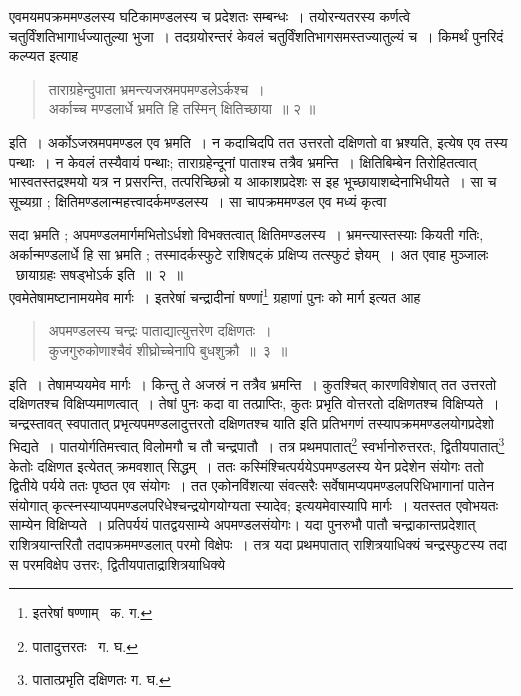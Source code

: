 \documentclass[11pt, openany]{book}
\begin{document}
\indent एवमयमपक्रममण्डलस्य घटिकामण्डलस्य च प्रदेशतः सम्बन्धः~। तयोरन्यतरस्य कर्णत्वे चतुर्विंशतिभागार्धज्यातुल्या भुजा~।	तदग्रयोरन्तरं केवलं चतुर्विंशतिभागसमस्तज्यातुल्यं च~। किमर्थं पुनरिदं कल्प्यत इत्याह\textendash

\begin{quote}
{\ab ताराग्रहेन्दुपाता भ्रमन्त्यजस्रमपमण्डलेऽर्कश्च~।\\
 अर्काच्च मण्डलार्धे भ्रमति हि तस्मिन् क्षितिच्छाया~॥ २ ॥}
\end{quote}

\indent इति~। अर्कोऽजस्रमपमण्डल एव भ्रमति~। न कदाचिदपि तत उत्तरतो दक्षिणतो वा भ्रश्यति, इत्येष एव तस्य पन्थाः~। न केवलं 
तस्यैवायं पन्थाः; ताराग्रहेन्दूनां पाताश्च तत्रैव भ्रमन्ति~। क्षितिबिम्बेन तिरोहितत्वात् भास्वतस्तद्रश्मयो यत्र न प्रसरन्ति, तत्परिच्छिन्नो य आकाशप्रदेशः स इह भूच्छायाशब्देनाभिधीयते~। सा च सूच्यग्रा ; क्षितिमण्डलान्महत्त्वादर्कमण्डलस्य~। सा चापक्रममण्डल एव मध्यं
कृत्वा 
\newpage 

\noindent सदा भ्रमति ; अपमण्डलमार्गमभितोऽर्धशो विभक्तत्वात् क्षितिमण्डलस्य~। भ्रमन्त्यास्तस्याः कियती गतिः, अर्कान्मण्डलार्धे हि सा भ्रमति ; तस्मादर्कस्फुटे राशिषट्कं प्रक्षिप्य तत्स्फुटं ज्ञेयम्~। अत एवाह मुञ्जालः \textendash\ {\qt छायाग्रहः
सषड्भोऽर्क} इति~॥~२~॥ \\

एवमेतेषामष्टानामयमेव मार्गः~। इतरेषां चन्द्रादीनां षण्णां\renewcommand{\thefootnote}{१}\footnote{इतरेषां षण्णाम् \textendash\ क. ग.} ग्रहाणां पुनः को मार्ग इत्यत आह\textendash  

\begin{quote}
 {\ab अपमण्डलस्य चन्द्रः पाताद्यात्युत्तरेण दक्षिणतः~।\\
कुजगुरुकोणाश्चैवं शीघ्रोच्चेनापि बुधशुक्रौ~॥~३~॥}
\end{quote}

\indent इति~। तेषामप्ययमेव मार्गः~। किन्तु ते अजस्रं न तत्रैव भ्रमन्ति~। कुतश्चित् कारणविशेषात् तत उत्तरतो दक्षिणतश्च विक्षिप्यमाणत्वात्~। तेषां पुनः कदा वा तत्प्राप्तिः, कुतः प्रभृति वोत्तरतो दक्षिणतश्च विक्षिप्यते~। 
चन्द्रस्तावत् स्वपातात् प्रभृत्यपमण्डलादुत्तरतो दक्षिणतश्च याति इति प्रतिभगणं तस्यापक्रममण्डलयोगप्रदेशो भिद्यते~। पातयोर्गतिमत्त्वात् विलोमगौ च तौ चन्द्रपातौ~। तत्र प्रथमपातात्\renewcommand{\thefootnote}{२}\footnote{पातादुत्तरतः \textendash\ ग. घ. } स्वर्भानोरुत्तरतः, द्वितीयपातात्\renewcommand{\thefootnote}{३}\footnote{पातात्प्रभृति दक्षिणतः \textendash ग. घ.} केतोः दक्षिणत इत्येतत् क्रमवशात् सिद्धम्~। ततः कस्मिंश्चित्पर्ययेऽपमण्डलस्य येन प्रदेशेन संयोगः ततो द्वितीये पर्यये ततः पृष्ठत एव संयोगः~। तत एकोनविंशत्या संवत्सरैः सर्वेषामप्यपमण्डलपरिधिभागानां पातेन संयोगात् कृत्स्नस्याप्यपमण्डलपरिधेश्चन्द्रयोगयोग्यता स्यादेव; इत्ययमेवास्यापि मार्गः~। यतस्तत एवोभयतः साम्येन विक्षिप्यते~। प्रतिपर्ययं पातद्वयसाम्ये अपमण्डलसंयोगः। यदा पुनरुभौ पातौ चन्द्राकान्तप्रदेशात् राशित्रयान्तरितौ तदापक्रममण्डलात् परमो विक्षेपः~। तत्र यदा प्रथमपातात् राशित्रयाधिक्यं चन्द्रस्फुटस्य तदा स परमविक्षेप उत्तरः, द्वितीयपाताद्राशित्रयाधिक्ये 
\end{document}
